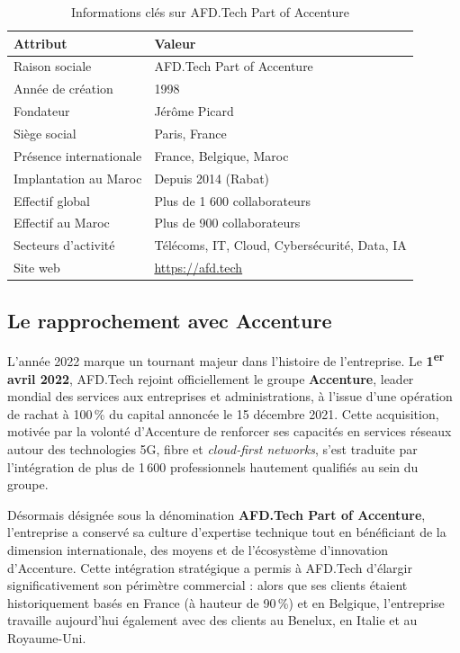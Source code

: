 \begin{table}[h]
\centering
\renewcommand{\arraystretch}{1.3}
\begin{tabular}{|l|l|}
\hline
\textbf{Attribut} & \textbf{Valeur} \\
\hline
Raison sociale & AFD.Tech Part of Accenture \\
\hline
Année de création & 1998 \\
\hline
Fondateur & Jérôme Picard \\
\hline
Siège social & Paris, France \\
\hline
Présence internationale & France, Belgique, Maroc \\
\hline
Implantation au Maroc & Depuis 2014 (Rabat) \\
\hline
Effectif global & Plus de 1 600 collaborateurs \\
\hline
Effectif au Maroc & Plus de 900 collaborateurs \\
\hline
Secteurs d'activité & Télécoms, IT, Cloud, Cybersécurité, Data, IA \\
\hline
Site web & \url{https://afd.tech} \\
\hline
\end{tabular}
\caption{Informations clés sur AFD.Tech Part of Accenture}
\label{tab:afdtech-info}
\end{table}



\subsection{Le rapprochement avec Accenture}

L'année 2022 marque un tournant majeur dans l'histoire de l'entreprise. Le \textbf{1\textsuperscript{er} avril 2022}, AFD.Tech rejoint officiellement le groupe \textbf{Accenture}, leader mondial des services aux entreprises et administrations, à l'issue d'une opération de rachat à 100\,\% du capital annoncée le 15 décembre 2021. Cette acquisition, motivée par la volonté d'Accenture de renforcer ses capacités en services réseaux autour des technologies 5G, fibre et \textit{cloud-first networks}, s'est traduite par l'intégration de plus de 1\,600 professionnels hautement qualifiés au sein du groupe.

Désormais désignée sous la dénomination \textbf{AFD.Tech Part of Accenture}, l'entreprise a conservé sa culture d'expertise technique tout en bénéficiant de la dimension internationale, des moyens et de l'écosystème d'innovation d'Accenture. Cette intégration stratégique a permis à AFD.Tech d'élargir significativement son périmètre commercial : alors que ses clients étaient historiquement basés en France (à hauteur de 90\,\%) et en Belgique, l'entreprise travaille aujourd'hui également avec des clients au Benelux, en Italie et au Royaume-Uni.

